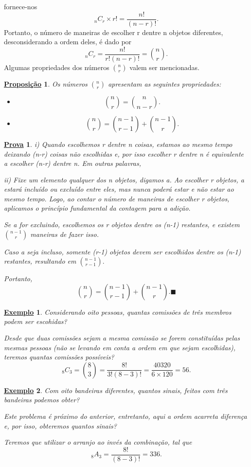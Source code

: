 \documentclass{article}
\newtheorem*{prop*}{\underline{Proposi\c c\~ao}}
\newtheorem{example}{\underline{Exemplo}}
\newtheorem*{proof*}{\underline{Prova}}
\renewcommand\qedsymbol{$\blacksquare$}
\begin{document}
fornece-nos 
  \[
    _{n}C_{r}\times r! = \frac{n!}{(n-r)!}.
  \]
  Portanto, o número de maneiras de escolher r dentre n objetos diferentes, desconsiderando
a ordem deles, é dado por 
  \[
    _{n}C_{r} = \frac{n!}{r!(n-r)!} = \binom{n}{r}.
  \]
  Algumas propriedades dos números \(\binom{n}{r}\) valem ser mencionadas.
 \begin{prop*}
   Os números \(\binom{n}{r}\) apresentam as seguintes propriedades:
  \begin{itemize}
    \item[i)]   
  \[
    \binom{n}{r} = \binom{n}{n-r}.
  \]
    \item[ii)] 
      \[
        \binom{n}{r} = \binom{n-1}{r-1} + \binom{n-1}{r}.
      \]
  \end{itemize}
 \end{prop*}
\begin{proof*}
  i) Quando escolhemos r dentre n coisas, estamos ao mesmo tempo deixando (n-r) coisas não escolhidas e, por isso
escolher r dentre n é equivalente a escolher (n-r) dentre n. Em outras palavras, 

  ii) Fixe um elemento qualquer dos n objetos, digamos a. Ao escolher r objetos, a estará incluído ou excluído entre eles,
mas nunca poderá estar e não estar ao mesmo tempo. Logo, ao contar o número de maneiras de escolher r objetos,
aplicamos o princípio fundamental da contagem para a adição. 

  Se a for excluindo, escolhemos os r objetos dentre os (n-1) restantes, e existem \(\binom{n-1}{r}\) maneiras de fazer isso. 

  Caso a seja incluso, somente (r-1) objetos devem ser escolhidos dentre os (n-1) restantes, resultando em \(\binom{n-1}{r-1}.\)

  Portanto, 
    \[
      \binom{n}{r} = \binom{n-1}{r-1} + \binom{n-1}{r}.\text{\qedsymbol}
    \]
\end{proof*}
\begin{example}
  Considerando oito pessoas, quantas comissões de três membros podem ser escohidas?

  Desde que duas comissões sejam a mesma comissão se forem constituídas pelas mesmas pessoas
(não se levando em conta a ordem em que sejam escolhidas), teremos quantas comissões possíveis? 
  \[
    _{8}C_{3} = \binom{8}{3} = \frac{8!}{3!(8-3)!} = \frac{40320}{6\times 120} = 56.
  \]
\end{example}
\begin{example}
  Com oito bandeiras diferentes, quantos sinais, feitos com três bandeiras podemos obter?

  Este problema é próximo do anterior, entretanto, aqui a ordem acarreta diferença e, por isso, obteremos quantos sinais?

  Teremos que utilizar o arranjo ao invés da combinação, tal que 
  \[
    _{8}A_{3} = \frac{8!}{(8-3)!} = 336.
  \]
\end{example}
\end{document}
